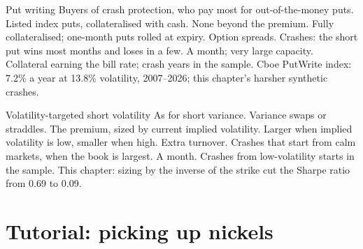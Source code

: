 \begin{strategyfile}{Put writing}\label{strat:s2:harvesting-the-variance-risk-premium:putwrite}
 Buyers of crash protection, who pay most for out-of-the-money puts.
 Listed index puts, collateralised with cash.
 None beyond the premium.
 Fully collateralised; one-month puts rolled at expiry.
 Option spreads.
 Crashes: the short put wins most months and loses in a few.
 A month; very large capacity.
 Collateral earning the bill rate; crash years in the sample.
 Cboe PutWrite index: 7.2\% a year at 13.8\% volatility, 2007--2026; this chapter's harsher synthetic crashes.
\end{strategyfile}

\begin{strategyfile}{Volatility-targeted short volatility}\label{strat:s2:harvesting-the-variance-risk-premium:voltarget}
 As for short variance.
 Variance swaps or straddles.
 The premium, sized by current implied volatility.
 Larger when implied volatility is low, smaller when high.
 Extra turnover.
 Crashes that start from calm markets, when the book is largest.
 A month.
 Crashes from low-volatility starts in the sample.
 This chapter: sizing by the inverse of the strike cut the Sharpe ratio from 0.69 to 0.09.
\end{strategyfile}

\section{Tutorial: picking up nickels}\label{tut:s2:harvesting-the-variance-risk-premium:tut}

